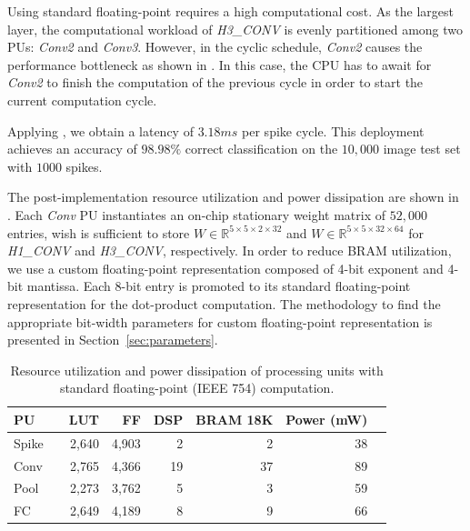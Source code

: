 Using standard floating-point requires a high computational cost. As the largest layer, the computational workload of \emph{H3\_CONV} is evenly partitioned among two PUs: \emph{Conv2} and \emph{Conv3}. However, in the cyclic schedule, \emph{Conv2} causes the performance bottleneck as shown in . In this case, the CPU has to await for \emph{Conv2} to finish the computation of the previous cycle in order to start the current computation cycle.

Applying , we obtain a latency of $3.18 ms$ per spike cycle. This deployment achieves an accuracy of $98.98\%$ correct classification on the $10,000$ image test set with $1000$ spikes.

The post-implementation resource utilization and power dissipation are shown in .
Each \emph{Conv} PU instantiates an on-chip stationary weight matrix of $52,000$ entries, wish is sufficient to store $W\in\mathbb{R}^{5\times 5\times 2\times 32}$ and $W\in\mathbb{R}^{5\times 5\times 32\times 64}$ for \emph{H1\_CONV} and \emph{H3\_CONV}, respectively. In order to reduce BRAM utilization, we use a custom floating-point representation composed of 4-bit exponent and 4-bit mantissa. Each 8-bit entry is promoted to its standard floating-point representation for the dot-product computation. The methodology to find the appropriate bit-width parameters for custom floating-point representation is presented in Section~\ref{sec:parameters}.

\begin{table}[!h]\centering
	\caption{Resource utilization and power dissipation of processing units with standard floating-point (IEEE 754) computation.}\label{tab:resource_fp}
	\scriptsize
	\begin{tabular}{lrrrrrrr}\toprule
		\textbf{PU} & &\textbf{LUT} &\textbf{FF} &\textbf{DSP} &\textbf{BRAM 18K} &\textbf{Power (mW)} \\\midrule
		Spike & &2,640 &4,903 &2 &2 &38 \\
		Conv & &2,765 &4,366 &19 &37 &89 \\
		Pool & &2,273 &3,762 &5 &3 &59 \\
		FC & &2,649 &4,189 &8 &9 &66 \\
		\bottomrule
	\end{tabular}
\end{table}

